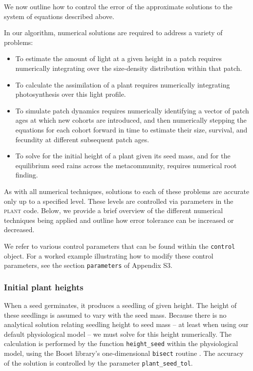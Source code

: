 \documentclass[10pt,twoside]{article}
\newcommand{\plant}{\textsc{plant}}
\begin{document}
We now outline how to control the error of the approximate solutions
to the system of equations described above.

In our algorithm, numerical solutions are required to address a variety of problems:
\begin{itemize}
\item To estimate the amount of light at a given height in a patch requires
numerically integrating over the size-density distribution within that patch.
\item To calculate the
assimilation of a plant requires numerically integrating
photosynthesis over this light profile.
\item To simulate patch dynamics
requires numerically identifying a vector of patch ages at which new cohorts are
introduced, and then numerically stepping the equations for each cohort forward in time to
estimate their size, survival, and fecundity at different subsequent patch ages.
\item To solve for the initial height of a plant given
its seed mass, and for the equilibrium seed rains across the
metacommunity, requires numerical root finding.
\end{itemize}

As with all numerical techniques, solutions to each of these problems are
accurate only up to a specified level. These levels are controlled
via parameters in the {\plant} code. Below, we
provide a brief overview of the different numerical techniques being
applied and outline how error tolerance can be increased or decreased.

We refer to various control parameters that can be found within the
\texttt{control} object. For a worked example illustrating how to modify these control parameters,
see the section \texttt{parameters} of Appendix S3.

\subsubsection{Initial plant heights}\label{initial-height-of-plants}

When a seed germinates, it produces a seedling of given height. The
height of these seedlings is assumed to vary with the seed mass.
Because there is no analytical solution relating seedling height to seed
mass -- at least when using our default physiological model -- we must solve
for this height numerically. The calculation is performed by the function
\texttt{height\_seed} within the physiological model, using the Boost
library's one-dimensional \texttt{bisect} routine
\citep{Schaling-2014, Eddelbuettel-2015}. The accuracy of the solution
is controlled by the parameter \texttt{plant\_seed\_tol}.
\end{document}
